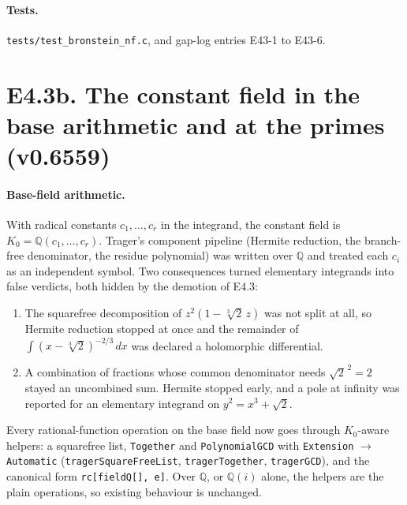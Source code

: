 \documentclass[11pt]{article}
\theoremstyle{definition}
\theoremstyle{remark}
\newcommand{\Q}{\mathbb{Q}}
\newcommand{\code}[1]{\texttt{#1}}
\begin{document}
\paragraph{Tests.} \code{tests/test\_bronstein\_nf.c}, and gap-log entries
E43-1 to E43-6.

\section*{E4.3b. The constant field in the base arithmetic and at the primes (v0.6559)}

\paragraph{Base-field arithmetic.} With radical constants $c_1,\dots,c_r$ in the
integrand, the constant field is $K_0=\Q(c_1,\dots,c_r)$. Trager's component
pipeline (Hermite reduction, the branch-free denominator, the residue
polynomial) was written over $\Q$ and treated each $c_i$ as an independent
symbol. Two consequences turned elementary integrands into false verdicts,
both hidden by the demotion of E4.3:
\begin{enumerate}
\item The squarefree decomposition of $z^2(1-\sqrt[3]2\,z)$ was not split at
  all, so Hermite reduction stopped at once and the remainder of
  $\int(x-\sqrt[3]2)^{-2/3}\,dx$ was declared a holomorphic differential.
\item A combination of fractions whose common denominator needs
  $\sqrt2^{\,2}=2$ stayed an uncombined sum. Hermite stopped early, and a
  pole at infinity was reported for an elementary integrand on
  $y^2=x^3+\sqrt2$.
\end{enumerate}
Every rational-function operation on the base field now goes through
$K_0$-aware helpers: a squarefree list, \code{Together} and \code{PolynomialGCD}
with \code{Extension} $\to$ \code{Automatic} (\code{tragerSquareFreeList},
\code{tragerTogether}, \code{tragerGCD}), and the canonical form
\code{rc[fieldQ[], e]}. Over $\Q$, or $\Q(i)$ alone, the helpers are the plain
operations, so existing behaviour is unchanged.
\end{document}

